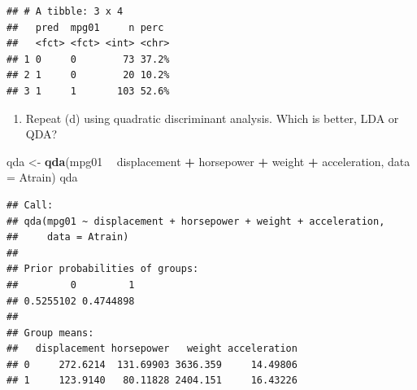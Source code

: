 \documentclass[]{article}
\newenvironment{Shaded}{\begin{snugshade}}{\end{snugshade}}
\newcommand{\CommentTok}[1]{\textcolor[rgb]{0.56,0.35,0.01}{\textit{#1}}}
\newcommand{\DataTypeTok}[1]{\textcolor[rgb]{0.13,0.29,0.53}{#1}}
\newcommand{\KeywordTok}[1]{\textcolor[rgb]{0.13,0.29,0.53}{\textbf{#1}}}
\newcommand{\NormalTok}[1]{#1}
\newcommand{\OperatorTok}[1]{\textcolor[rgb]{0.81,0.36,0.00}{\textbf{#1}}}
\newcommand{\StringTok}[1]{\textcolor[rgb]{0.31,0.60,0.02}{#1}}
\providecommand{\tightlist}{%
  \setlength{\itemsep}{0pt}\setlength{\parskip}{0pt}}
\begin{document}
\begin{Shaded}
\end{Shaded}

\begin{verbatim}
## # A tibble: 3 x 4
##   pred  mpg01     n perc 
##   <fct> <fct> <int> <chr>
## 1 0     0        73 37.2%
## 2 1     0        20 10.2%
## 3 1     1       103 52.6%
\end{verbatim}

\begin{Shaded}
\end{Shaded}

\begin{enumerate}
\def\labelenumi{(\alph{enumi})}
\setcounter{enumi}{4}
\tightlist
\item
  Repeat (d) using quadratic discriminant analysis. Which is better, LDA
  or QDA?
\end{enumerate}

\begin{Shaded}
\begin{Highlighting}[]
\NormalTok{qda <-}\StringTok{ }\KeywordTok{qda}\NormalTok{(mpg01 }\OperatorTok{~}\StringTok{ }\NormalTok{displacement }\OperatorTok{+}\StringTok{ }\NormalTok{horsepower }\OperatorTok{+}\StringTok{ }
\StringTok{           }\NormalTok{weight }\OperatorTok{+}\StringTok{ }\NormalTok{acceleration, }\DataTypeTok{data =}\NormalTok{ Atrain)}
\NormalTok{qda}
\end{Highlighting}
\end{Shaded}

\begin{verbatim}
## Call:
## qda(mpg01 ~ displacement + horsepower + weight + acceleration, 
##     data = Atrain)
## 
## Prior probabilities of groups:
##         0         1 
## 0.5255102 0.4744898 
## 
## Group means:
##   displacement horsepower   weight acceleration
## 0     272.6214  131.69903 3636.359     14.49806
## 1     123.9140   80.11828 2404.151     16.43226
\end{verbatim}
\end{document}
